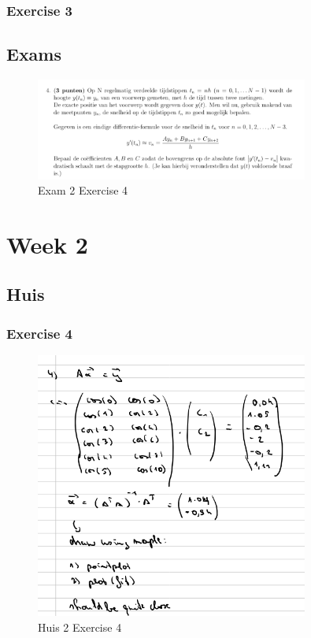 \documentclass[a4paper]{report}
\begin{document}
\subsubsection{Exercise 3}



\subsection{Exams}

\begin{figure}[H]
	\centering
	\includegraphics[width=0.8\textwidth]{assets/exam_2_ex_4_question.png}
	\caption{Exam 2 Exercise 4}
	\label{fig:exam_2_ex_4_question}
\end{figure}



\section{Week 2}

\subsection{Huis}

\subsubsection{Exercise 4}

\begin{figure}[H]
	\centering
	\includegraphics[width=0.8\textwidth]{images/huis_2_4.png}
	\caption{Huis 2 Exercise 4}
	\label{fig:huis_2_ex_4}
\end{figure}
\end{document}
